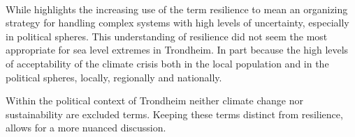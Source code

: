 \paragraph{}

While \cite{moser_turbulent_2019} highlights the increasing use of the term resilience to mean an organizing strategy for handling complex systems with high levels of uncertainty, especially in political spheres. This understanding of resilience did not seem the most appropriate for sea level extremes in Trondheim. In part because the high levels of acceptability of the climate crisis both in the local population and in the political spheres, locally, regionally and nationally. 

Within the political context of Trondheim neither climate change nor sustainability are excluded terms. Keeping these terms distinct from resilience, allows for a more nuanced discussion.







